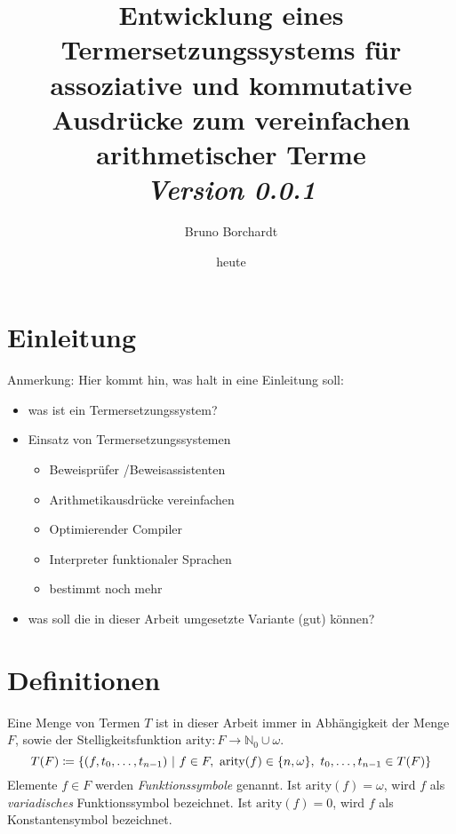 \documentclass{article}
\title{Entwicklung eines Termersetzungssystems für assoziative und kommutative Ausdrücke zum vereinfachen arithmetischer Terme\\ \textit{Version 0.0.1}}
\author{Bruno Borchardt}
\date{heute}
\DeclarePairedDelimiter\curl{\{}{\}}
\begin{document}
\maketitle

\tableofcontents

\clearpage

\section{Einleitung}
\begin{itshape}
Anmerkung: Hier kommt hin, was halt in eine Einleitung soll:
\begin{itemize}
    \item was ist ein Termersetzungssystem?
    \item Einsatz von Termersetzungssystemen
    \begin{itemize}
        \item Beweisprüfer /Beweisassistenten
        \item Arithmetikausdrücke vereinfachen
        \item Optimierender Compiler
	\item Interpreter funktionaler Sprachen
        \item bestimmt noch mehr
    \end{itemize}
    \item was soll die in dieser Arbeit umgesetzte Variante (gut) können?
\end{itemize}
\end{itshape}

\section{Definitionen}
Eine Menge von Termen $T$ ist in dieser Arbeit immer  in Abhängigkeit der Menge $F$, sowie der Stelligkeitsfunktion $\mathrm{arity} \colon F \rightarrow \mathbb{N}_0 \cup \omega$.
$$T(F) \coloneqq \curl*{
(f, t_0, \dots, t_{n-1})
~|
~f\in F,
~\mathrm{arity}(f) \in \{n, \omega\},
~ t_0, \dots,t_{n-1} \in T(F)
}$$ 
Elemente $f\in F$ werden \textit{Funktionssymbole} genannt. Ist $\mathrm{arity}(f) = \omega$, wird $f$ als \textit{variadisches} Funktionssymbol bezeichnet. Ist $\mathrm{arity}(f) = 0$, wird $f$ als Konstantensymbol bezeichnet.
\end{document}
